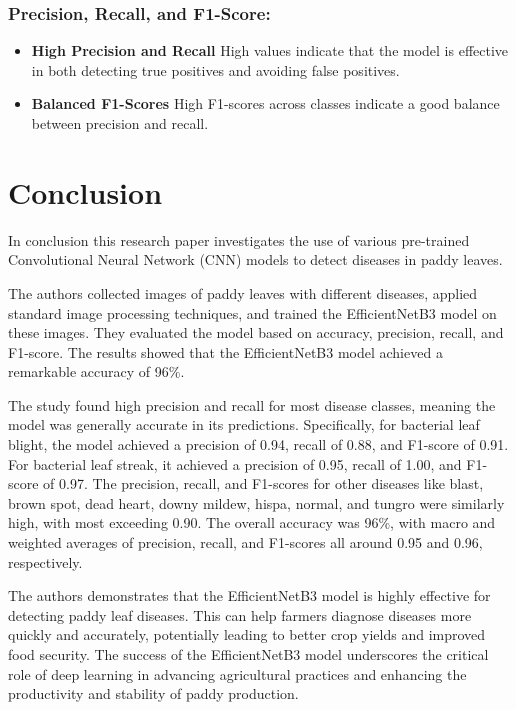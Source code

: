 \documentclass[conference]{IEEEtran}
\begin{document}
\subsubsection{Precision, Recall, and F1-Score:}
\begin{itemize}
    \item \textbf{High Precision and Recall} High values indicate that the model is effective in both detecting true positives and avoiding false positives.
    \item \textbf{Balanced F1-Scores} High F1-scores across classes indicate a good balance between precision and recall.
\end{itemize}

\section{Conclusion}
In conclusion this research paper investigates the use of various pre-trained Convolutional Neural Network (CNN) models to detect diseases in paddy leaves.

The authors collected images of paddy leaves with different diseases, applied standard image processing techniques, and trained the EfficientNetB3 model on these images. They evaluated the model based on accuracy, precision, recall, and F1-score. The results showed that the EfficientNetB3 model achieved a remarkable accuracy of 96\%.

The study found high precision and recall for most disease classes, meaning the model was generally accurate in its predictions. Specifically, for bacterial leaf blight, the model achieved a precision of 0.94, recall of 0.88, and F1-score of 0.91. For bacterial leaf streak, it achieved a precision of 0.95, recall of 1.00, and F1-score of 0.97. The precision, recall, and F1-scores for other diseases like blast, brown spot, dead heart, downy mildew, hispa, normal, and tungro were similarly high, with most exceeding 0.90. The overall accuracy was 96\%, with macro and weighted averages of precision, recall, and F1-scores all around 0.95 and 0.96, respectively.

The authors demonstrates that the EfficientNetB3 model is highly effective for detecting paddy leaf diseases. This can help farmers diagnose diseases more quickly and accurately, potentially leading to better crop yields and improved food security. The success of the EfficientNetB3 model underscores the critical role of deep learning in advancing agricultural practices and enhancing the productivity and stability of paddy production.
\end{document}
